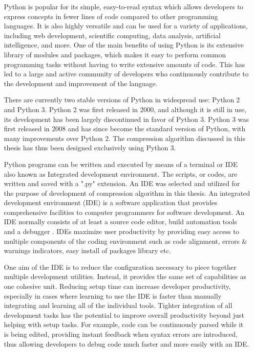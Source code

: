 Python is popular for its simple, easy-to-read syntax which allows developers to express concepts in fewer lines of code compared to other programming languages. It is also highly versatile and can be used for a variety of applications, including web development, scientific computing, data analysis, artificial intelligence, and more. One of the main benefits of using Python is its extensive library of modules and packages, which makes it easy to perform common programming tasks without having to write extensive amounts of code. This has led to a large and active community of developers who continuously contribute to the development and improvement of the language.

There are currently two stable versions of Python in widespread use: Python 2 and Python 3. Python 2 was first released in 2000, and although it is still in use, its development has been largely discontinued in favor of Python 3. Python 3 was first released in 2008 and has since become the standard version of Python, with many improvements over Python 2. The compression algorithm discussed in this thesis has thus been designed exclusively using Python 3. 

Python programs can be written and executed by means of a terminal or IDE also known as Integrated development environment. The scripts, or codes, are written and saved with a ".py" extension. An IDE was selected and utilized for the purpose of development of compression algorithm in this thesis. An integrated development environment (IDE) is a software application that provides comprehensive facilities to computer programmers for software development. An IDE normally consists of at least a source code editor, build automation tools and a debugger \cite{PyWiki}. IDEs maximize user productivity by providing easy access to multiple components of the coding environment such as code alignment, errors \& warnings indicators, easy install of packages library etc.   

One aim of the IDE is to reduce the configuration necessary to piece together multiple development utilities. Instead, it provides the same set of capabilities as one cohesive unit. Reducing setup time can increase developer productivity, especially in cases where learning to use the IDE is faster than manually integrating and learning all of the individual tools. Tighter integration of all development tasks has the potential to improve overall productivity beyond just helping with setup tasks. For example, code can be continuously parsed while it is being edited, providing instant feedback when syntax errors are introduced, thus allowing developers to debug code much faster and more easily with an IDE.

